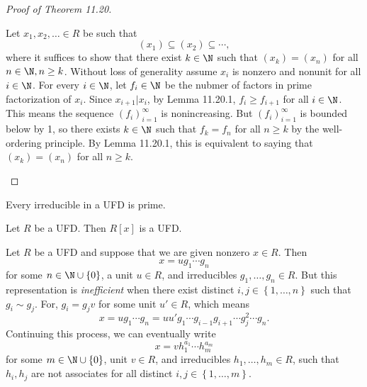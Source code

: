 \documentclass[pmath347]{subfiles}
\begin{document}
\begin{proof}[Proof of Theorem 11.20]
\begin{itemize}
                \begin{subproof}
                    Let $x_1,x_2,\ldots\in R$ be such that
                    \begin{equation*}
                        \left( x_1 \right) \subseteq \left( x_2 \right) \subseteq\cdots,
                    \end{equation*}
                    where it suffices to show that there exist $k\in\N$ such that $\left( x_k \right) = \left( x_n \right)$ for all $n\in\N, n\geq k$. Without loss of generality assume $x_i$ is nonzero and nonunit for all $i\in\N$. For every $i\in\N$, let $f_i\in\N$ be the nubmer of factors in prime factorization of $x_i$. Since $x_{i+1}|x_i$, by Lemma 11.20.1, $f_i\geq f_{i+1}$ for all $i\in\N$. This means the sequence $\left( f_{i} \right)^{\infty}_{i=1}$ is nonincreasing. But $\left( f_{i} \right)^{\infty}_{i=1}$ is bounded below by 1, so there exists $k\in\N$ such that $f_k=f_n$ for all $n\geq k$ by the well-ordering principle. By Lemma 11.20.1, this is equivalent to saying that $\left( x_k \right) = \left( x_n \right)$ for all $n\geq k$. \qqedsym
                \end{subproof}
        \end{itemize} 
    \end{proof}

    \begin{cor}{}
        Every irreducible in a UFD is prime.
    \end{cor}	

    \clearpage
    \begin{prop}{}
        Let $R$ be a UFD. Then $R\left[ x \right]$ is a UFD.
    \end{prop}

    \np Let $R$ be a UFD and suppose that we are given nonzero $x\in R$. Then
    \begin{equation*}
        x = ug_1\cdots g_n
    \end{equation*}
    for some $n\in\N\cup\left\lbrace 0 \right\rbrace$, a unit $u\in R$, and irreducibles $g_1,\ldots,g_n\in R$. But this representation is \textit{inefficient} when there exist distinct $i,j\in\left\lbrace 1,\ldots,n \right\rbrace$ such that $g_i\sim g_j$. For, $g_i=g_jv$ for some unit $u'\in R$, which means
    \begin{equation*}
        x = ug_1\cdots g_n = uu'g_1\cdots g_{i-1}g_{i+1}\cdots g_j^{2} \cdots g_n.
    \end{equation*}
    Continuing this process, we can eventually write
    \begin{equation*}
        x = vh_1^{a_1}\cdots h_m^{a_m}
    \end{equation*}
    for some $m\in\N\cup\left\lbrace 0 \right\rbrace$, unit $v\in R$, and irreducibles $h_1,\ldots,h_m\in R$, such that $h_i, h_j$ are not associates for all distinct $i,j\in\left\lbrace 1,\ldots,m \right\rbrace$.
\end{document}
